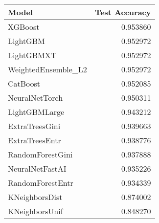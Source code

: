 \begin{tabular}{lr}
\toprule
Model & Test Accuracy \\
\midrule
XGBoost & 0.953860 \\
LightGBM & 0.952972 \\
LightGBMXT & 0.952972 \\
WeightedEnsemble_L2 & 0.952972 \\
CatBoost & 0.952085 \\
NeuralNetTorch & 0.950311 \\
LightGBMLarge & 0.943212 \\
ExtraTreesGini & 0.939663 \\
ExtraTreesEntr & 0.938776 \\
RandomForestGini & 0.937888 \\
NeuralNetFastAI & 0.935226 \\
RandomForestEntr & 0.934339 \\
KNeighborsDist & 0.874002 \\
KNeighborsUnif & 0.848270 \\
\bottomrule
\end{tabular}
